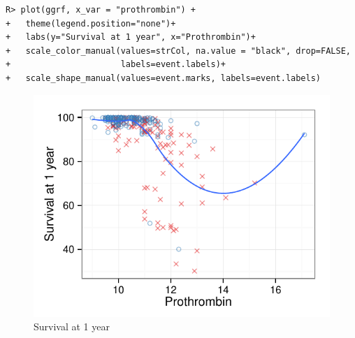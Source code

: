 \documentclass[nojss]{jss}
\begin{document}
\begin{knitrout}\footnotesize
{}\color{fgcolor}\begin{kframe}
\begin{verbatim}
R> plot(ggrf, x_var = "prothrombin") +
+   theme(legend.position="none")+
+   labs(y="Survival at 1 year", x="Prothrombin")+
+   scale_color_manual(values=strCol, na.value = "black", drop=FALSE,
+                      labels=event.labels)+
+   scale_shape_manual(values=event.marks, labels=event.labels)
\end{verbatim}
\end{kframe}\begin{figure}[!htpb]

{\centering \includegraphics[width=\maxwidth]{figure/rfs-variable-plotProthrombin-1} 

}

\caption[Survival at 1 year]{Survival at 1 year\label{fig:variable-plotProthrombin}}
\end{figure}


\end{knitrout}
\end{document}

